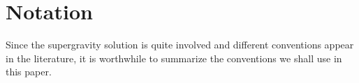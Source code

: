 \documentclass[11pt]{article}
\let\oldPhi=\Phi
\let\oldGamma=\Gamma
\let\oldPi=\Pi
\renewcommand{\Phi}{\mathnormal{\oldPhi}}
\renewcommand{\Gamma}{\mathnormal{\oldGamma}}
\renewcommand{\Pi}{\mathnormal{\oldPi}}
\begin{document}
%
%
%









\appendix

\section{Notation}\label{app:notation}
Since the supergravity solution is quite involved and different conventions appear in the literature,
it is worthwhile to summarize the conventions we shall use in this paper.
\end{document}
